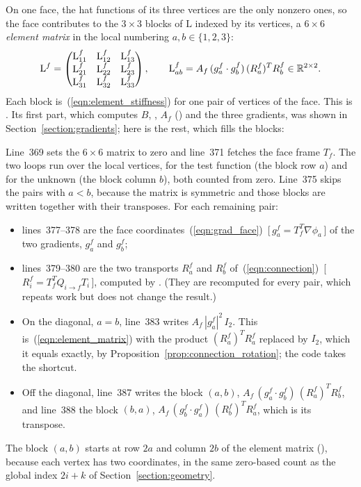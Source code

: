 On one face, the hat functions of its three vertices are the only nonzero ones, so the face contributes to the $3 \times 3$ blocks of $\mathrm L$ indexed by its vertices, a $6 \times 6$ \emph{element matrix} in the local numbering $a, b \in \{1, 2, 3\}$:
\begin{equation}
\label{eqn:element_matrix}
\mathrm L^f = \begin{pmatrix} \mathrm L^f_{11} & \mathrm L^f_{12} & \mathrm L^f_{13} \\ \mathrm L^f_{21} & \mathrm L^f_{22} & \mathrm L^f_{23} \\ \mathrm L^f_{31} & \mathrm L^f_{32} & \mathrm L^f_{33} \end{pmatrix}, \qquad \mathrm L^f_{ab} = A_f\, (g_a^f \cdot g_b^f)\, (R_a^f)^T R_b^f \in \mathbb{R}^{2 \times 2}.
\end{equation}
Each block is~(\ref{eqn:element_stiffness}) for one pair of vertices of the face. This is . Its first part, which computes $B$, , $A_f$ () and the three gradients, was shown in Section~\ref{section:gradients}; here is the rest, which fills the blocks:

Line~369 sets the $6 \times 6$ matrix to zero and line~371 fetches the face frame $T_f$. The two loops run over the local vertices,  for the test function (the block row $a$) and  for the unknown (the block column $b$), both counted from zero. Line~375 skips the pairs with $a < b$, because the matrix is symmetric and those blocks are written together with their transposes. For each remaining pair:
\begin{itemize}
\item lines~377--378 are the face coordinates~(\ref{eqn:grad_face})~[\,$g_a^f = T_f^T\nabla\phi_a$\,] of the two gradients, $g_a^f$ and $g_b^f$;
\item lines~379--380 are the two transports $R_a^f$ and $R_b^f$ of~(\ref{eqn:connection})~[\,$R_i^f = T_f^TQ_{i\to f}T_i$\,], computed by . (They are recomputed for every pair, which repeats work but does not change the result.)
\item On the diagonal, $a = b$, line~383 writes $A_f\, |g_a^f|^2\, I_2$. This is~(\ref{eqn:element_matrix}) with the product $(R_a^f)^T R_a^f$ replaced by $I_2$, which it equals exactly, by Proposition~\ref{prop:connection_rotation}; the code takes the shortcut.
\item Off the diagonal, line~387 writes the block $(a, b)$, $A_f\, (g_a^f\cdot g_b^f)\, (R_a^f)^T R_b^f$, and line~388 the block $(b, a)$, $A_f\, (g_b^f\cdot g_a^f)\, (R_b^f)^T R_a^f$, which is its transpose.
\end{itemize}
The block $(a, b)$ starts at row $2a$ and column $2b$ of the element matrix (), because each vertex has two coordinates, in the same zero-based count as the global index $2i + k$ of Section~\ref{section:geometry}.

